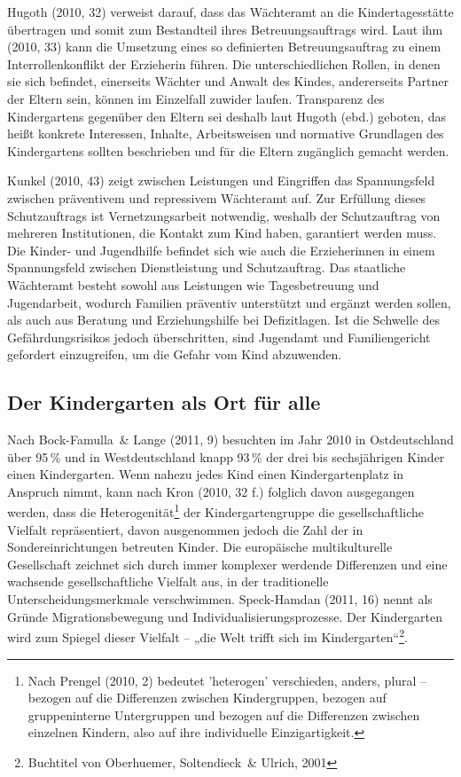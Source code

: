 Hugoth (2010, 32) verweist darauf, dass das Wächteramt an die Kindertagesstätte übertragen und somit zum Bestandteil ihres Betreuungsauftrags wird. Laut ihm (2010, 33) kann die Umsetzung eines so definierten Betreuungsauftrag zu einem Interrollenkonflikt der Erzieherin führen. Die unterschiedlichen Rollen, in denen sie sich befindet, einerseits Wächter und Anwalt des Kindes, andererseits Partner der Eltern sein, können im Einzelfall zuwider laufen. Transparenz des Kindergartens gegenüber den Eltern sei deshalb laut Hugoth (ebd.) geboten, das heißt konkrete Interessen, Inhalte, Arbeitsweisen und normative Grundlagen des Kindergartens sollten beschrieben und für die Eltern zugänglich gemacht werden. 

Kunkel (2010, 43) zeigt zwischen Leistungen und Eingriffen das Spannungsfeld zwischen präventivem und repressivem Wächteramt auf. Zur Erfüllung dieses Schutzauftrags ist Vernetzungsarbeit notwendig, weshalb der Schutzauftrag von mehreren Institutionen, die Kontakt zum Kind haben, garantiert werden muss.
Die Kinder- und Jugendhilfe befindet sich wie auch die Erzieherinnen in einem Spannungsfeld zwischen Dienstleistung und Schutzauftrag. Das staatliche Wächteramt besteht sowohl aus Leistungen wie Tagesbetreuung und Jugendarbeit, wodurch Familien präventiv unterstützt und ergänzt werden sollen, als auch aus Beratung und Erziehungshilfe bei Defizitlagen. Ist die Schwelle des Gefährdungsrisikos jedoch überschritten, sind Jugendamt und Familiengericht gefordert einzugreifen, um die Gefahr vom Kind abzuwenden. 

\subsection{Der Kindergarten als Ort für alle}\label{OrtFuerAlle}
Nach Bock-Famulla~\& Lange (2011, 9) besuchten im Jahr 2010 in Ostdeutschland über 95\,\% und in Westdeutschland knapp 93\,\% der drei bis sechsjährigen Kinder einen Kindergarten. Wenn nahezu jedes Kind einen Kindergartenplatz in Anspruch nimmt, kann nach Kron (2010, 32 f.) folglich davon ausgegangen werden, dass die Heterogenität\footnote{Nach Prengel (2010, 2) bedeutet 'heterogen' verschieden, anders, plural – bezogen auf die Differenzen zwischen Kindergruppen, bezogen auf gruppeninterne Untergruppen und bezogen auf die Differenzen zwischen einzelnen Kindern, also auf ihre individuelle Einzigartigkeit.}
der Kindergartengruppe die gesellschaftliche Vielfalt repräsentiert, davon ausgenommen jedoch die Zahl der in Sondereinrichtungen betreuten Kinder. Die europäische multikulturelle Gesellschaft zeichnet sich durch immer komplexer werdende Differenzen und eine wachsende gesellschaftliche Vielfalt aus, in der traditionelle Unterscheidungsmerkmale verschwimmen. Speck-Hamdan (2011, 16) nennt als Gründe Migrationsbewegung und Individualisierungsprozesse. Der Kindergarten wird zum Spiegel dieser Vielfalt – „die Welt trifft sich im Kindergarten“\footnote{Buchtitel von Oberhuemer, Soltendieck~\& Ulrich, 2001}.
 
